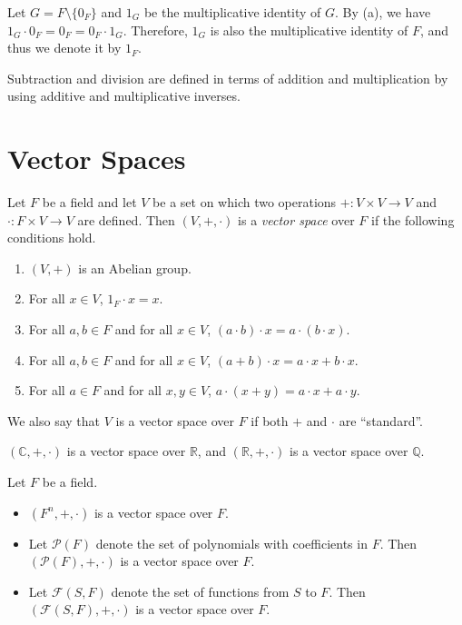 \begin{remark}
  Let $G = F \setminus \{0_F\}$ and $1_G$ be the multiplicative identity of
  $G$.
  By  (a), we have
  $1_G \cdot 0_F = 0_F = 0_F \cdot 1_G$.
  Therefore, $1_G$ is also the multiplicative identity of $F$, and thus we
  denote it by $1_F$.
\end{remark}

\begin{remark}
  Subtraction and division are defined in terms of addition and
  multiplication by using additive and multiplicative inverses.
\end{remark}

\section{Vector Spaces}
\begin{definition}\label{def:vector-space}
  Let $F$ be a field and let $V$ be a set on which two operations
  $+: V \times V \to V$ and $\cdot: F \times V \to V$ are defined.
  Then $(V, +, \cdot)$ is a \emph{vector space} over
  $F$ if the following conditions hold.
  \begin{enumerate}[label=(V \arabic*),leftmargin=3.5em]
    \item $(V, +)$ is an Abelian group.
    \item For all $x \in V$, $1_F \cdot x = x$.
    \item For all $a, b \in F$ and for all $x \in V$,
      $(a \cdot b) \cdot x = a \cdot (b \cdot x)$.
    \item For all $a, b \in F$ and for all $x \in V$,
      $(a + b) \cdot x = a \cdot x + b \cdot x$.
    \item For all $a \in F$ and for all $x, y \in V$,
      $a \cdot (x + y) = a \cdot x + a \cdot y$.
  \end{enumerate}
\end{definition}
\begin{remark}
  We also say that $V$ is a vector space over $F$ if both $+$ and $\cdot$
  are ``standard''.
\end{remark}

\begin{example}
  $(\mathbb{C}, +, \cdot)$ is a vector space over $\mathbb{R}$, and
  $(\mathbb{R}, +, \cdot)$ is a vector space over $\mathbb{Q}$.
\end{example}
\begin{example} Let $F$ be a field.
  \begin{itemize}
    \item $(F^n, +, \cdot)$ is a vector space over $F$.
    \item Let $\mathcal{P}(F)$ denote the set of polynomials with coefficients
      in $F$.
      Then $(\mathcal{P}(F), +, \cdot)$ is a vector space over $F$.
    \item Let $\mathcal{F}(S, F)$ denote the set of functions from $S$ to $F$.
      Then $(\mathcal{F}(S, F), +, \cdot)$ is a vector space over $F$.
  \end{itemize}
\end{example}

